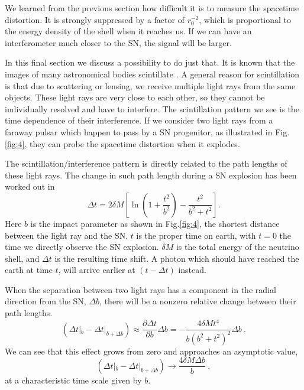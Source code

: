 \documentclass[aps,showpacs,onecolumn,floats,prd,superscriptaddress,nofootinbib]{revtex4-1}
\begin{document}
We learned from the previous section how difficult it is to measure the spacetime distortion. It is strongly suppressed by a factor of $r_0^{-2}$, which is proportional to the energy density of the shell when it reaches us. If we can have an interferometer much closer to the SN, the signal will be larger.

In this final section we discuss a possibility to do just that. It is known that the images of many astronomical bodies scintillate \cite{PulsarScint}. A general reason for scintillation is that due to scattering or lensing, we receive multiple light rays from the same objects. These light rays are very close to each other, so they cannot be individually resolved and have to interfere. The scintillation pattern we see is the time dependence of their interference. If we consider two light rays from a faraway pulsar which happen to pass by a SN progenitor, as illustrated in Fig.\ref{fig:4}, they can probe the spacetime distortion when it explodes. 

The scintillation/interference pattern is directly related to the path lengths of these light rays. The change in such path length during a SN explosion has been worked out in \cite{Olum:2013gza}
\begin{equation}
	\Delta t = 2\delta M \left[ \ln \left(1 + \frac{t^2}{b^2} \right) - \frac{t^2}{b^2 + t^2} \right].
\end{equation}
Here $b$ is the impact parameter as shown in Fig.\ref{fig:4}, the shortest distance between the light ray and the SN. $t$ is the proper time on earth, with $t=0$ the time we directly observe the SN explosion. $\delta M$ is the total energy of the neutrino shell, and $\Delta t$ is the resulting time shift. A photon which should have reached the earth at time $t$, will arrive earlier at $(t-\Delta t)$ instead.

When the separation between two light rays has a component in the radial direction from the SN, $\Delta b$, there will be a nonzero relative change between their path lengths.
\begin{equation}
	(\Delta t|_b - \Delta t|_{b+\Delta b}) \approx 
	\frac{\partial \Delta t}{\partial b} \Delta b 
	= - \frac{4\delta Mt^4}{b(b^2 + t^2)^2} \Delta b~.
	\label{eq-change}
\end{equation}
We can see that this effect grows from zero and approaches an asymptotic value,
\begin{equation}
	(\Delta t|_b - \Delta t|_{b+\Delta b}) 
	\longrightarrow \frac{4\delta M \Delta b}{b}~,
\end{equation}
at a characteristic time scale given by $b$. 
\end{document}
